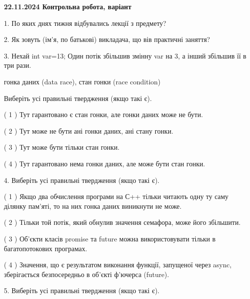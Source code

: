 \documentclass[12pt, ukrainian]{article}
\begin{document}
\vspace{4mm}
\newpage
\begin {large}

\textbf{22.11.2024 Контрольна робота, варіант  }\par


{
1. По яких днях тижня відбувались лекції з предмету?



\vspace{5mm}
2. Як зовуть (ім'я, по батькові) викладача, що вів практичні заняття?



\vspace{5mm}
3. Нехай int var=13; Один потік збільшив змінну var на 3, а інший збільшив її в три рази.

гонка даних (data race), стан гонки (race condition)

Виберіть усі правильні твердження (якщо такі є).\par
\vspace{2mm}
( 1 ) Тут гарантовано є стан гонки, але гонки даних може не бути.%

( 2 ) Тут може не бути ані гонки даних, ані стану гонки.%

( 3 ) Тут може бути тільки стан гонки.%

( 4 ) Тут гарантовано нема гонки даних, але може бути стан гонки.%


\vspace{5mm}
4. Виберіть усі правильні твердження (якщо такі є).\par
\vspace{2mm}

( 1 ) Якщо два обчислення програми на С++ тільки читають одну ту саму ділянку пам'яті, то на них гонка даних  виникнути не може.%

( 2 ) Тільки той потік, який обнулив значення семафора, може його збільшити.%

( 3 ) Об’єкти класів promise та future можна використовувати тільки в багатопотокових програмах.%

( 4 ) Значення, що є результатом виконання функції, запущеної через async, зберігається безпосередньо в об’єкті ф’ючерса (future).%


\vspace{5mm}
5. Виберіть усі правильні твердження (якщо такі є).\par
\vspace{2mm}

}
\end{large}
\end{document}
